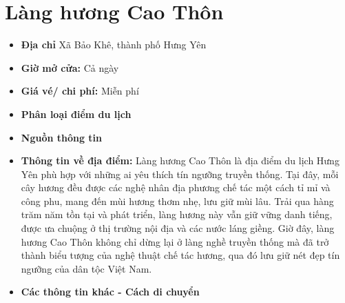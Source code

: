 \documentclass{article}
\begin{document}
\section{Làng hương Cao Thôn}
\begin{itemize}
    \item{\textbf{Địa chỉ}} Xã Bảo Khê, thành phố Hưng Yên

    \item{\textbf{Giờ mở cửa:}} Cả ngày

    \item{\textbf{Giá vé/ chi phí:}} Miễn phí

    \item{\textbf{Phân loại điểm du lịch}} 

    \item{\textbf{Nguồn thông tin}} 

    \item{\textbf{Thông tin về địa điểm:}} Làng hương Cao Thôn là địa điểm du lịch Hưng Yên phù hợp với những ai yêu thích tín ngưỡng truyền thống. Tại đây, mỗi cây hương đều được các nghệ nhân địa phương chế tác một cách tỉ mỉ và công phu, mang đến mùi hương thơm nhẹ, lưu giữ mùi lâu. Trải qua hàng trăm năm tồn tại và phát triển, làng hương này vẫn giữ vững danh tiếng, được ưa chuộng ở thị trường nội địa và các nước láng giềng. Giờ đây, làng hương Cao Thôn không chỉ dừng lại ở làng nghề truyền thống mà đã trở thành biểu tượng của nghệ thuật chế tác hương, qua đó lưu giữ nét đẹp tín ngưỡng của dân tộc Việt Nam.
\end{itemize}

\begin{itemize}
    \item{\textbf{Các thông tin khác - Cách di chuyển}} 
\end{itemize}
\end{document}
